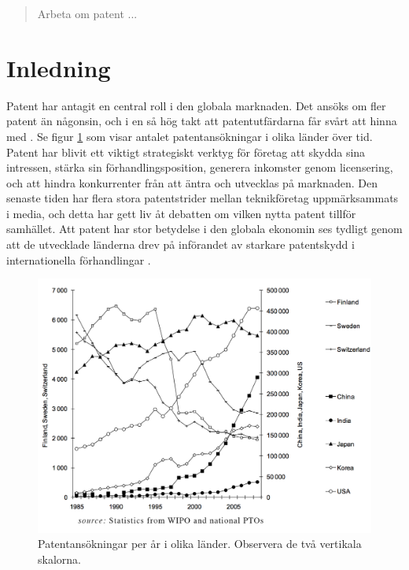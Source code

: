 
\begin{abstract}
	Arbeta om patent ...
\end{abstract}	
	
	
\section{Inledning}

Patent har antagit en central roll i den globala marknaden.
Det ansöks om fler patent än någonsin, och i en så hög takt att patentutfärdarna
får svårt att hinna med \cite{uspto_number}. Se figur \ref{fig:holg} som visar antalet patentansökningar i olika länder över tid.
Patent har blivit ett viktigt strategiskt verktyg för företag att skydda sina
intressen, stärka sin förhandlingsposition, generera inkomster genom
licensering, och att hindra konkurrenter från att äntra och utvecklas på
marknaden. 
Den senaste tiden har flera stora patentstrider mellan teknikföretag
uppmärksammats i media, och detta har gett liv åt debatten om vilken nytta
patent tillför samhället.
Att patent har stor betydelse i den globala ekonomin ses tydligt genom att
de utvecklade länderna drev på införandet av starkare patentskydd i
internationella förhandlingar \cite{ove}. 


\begin{figure}[h!]
  \centering
  \includegraphics[width=1.15\textwidth]{../holg.png}
  \caption{Patentansökningar per år i olika länder. Observera de två vertikala skalorna.}
  \label{fig:holg}
\end{figure}

